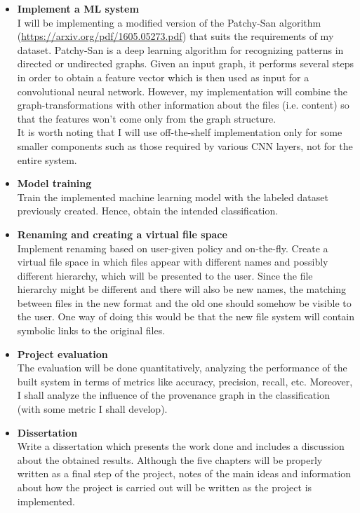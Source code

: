 \begin{itemize}
  \item \textbf{Implement a ML system}\\
        I will be implementing a modified version of the Patchy-San algorithm (\url{https://arxiv.org/pdf/1605.05273.pdf}) that suits the requirements of my dataset. Patchy-San is a deep learning algorithm for recognizing patterns in directed or undirected graphs. Given an input graph, it performs several steps in order to obtain a feature vector which is then used as input for a convolutional neural network. However, my implementation will combine the graph-transformations with other information about the files (i.e. content) so that the features won't come only from the graph structure. \\
        It is worth noting that I will use off-the-shelf implementation only for some smaller components such as those required by various CNN layers, not for the entire system. \\

  \item \textbf{Model training} \\
        Train the implemented machine learning model with the labeled dataset previously created. Hence, obtain the intended classification. \\

  \item \textbf{Renaming and creating a virtual file space} \\
        Implement renaming based on user-given policy and on-the-fly. Create a virtual file space in which files appear with different names and possibly different hierarchy, which will be presented to the user. Since the file hierarchy might be different and there will also be new names, the matching between files in the new format and the old one should somehow be visible to the user. One way of doing this would be that the new file system will contain symbolic links to the original files. \\

  \item \textbf{Project evaluation} \\
        The evaluation will be done quantitatively, analyzing the performance of the built system in terms of metrics like accuracy, precision, recall, etc. Moreover, I shall analyze the influence of the provenance graph in the classification (with some metric I shall develop).\\

  \item \textbf{Dissertation} \\
        Write a dissertation which presents the work done and includes a discussion about the obtained results. Although the five chapters will be properly written as a final step of the project, notes of the main ideas and information about how the project is carried out will be written as the project is implemented.

\end{itemize}



